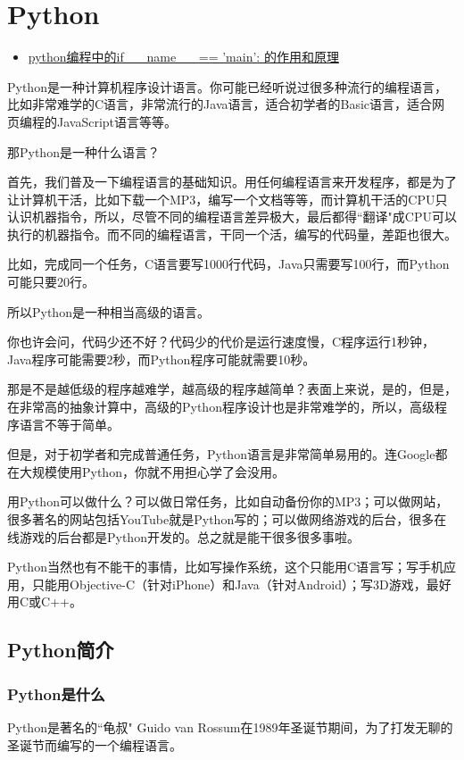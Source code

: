 \chapter{Python}

\begin{itemize}
\item \href{http://www.dengfeilong.com/post/60.html}{python编程中的if \_\_name\_\_ == 'main': 的作用和原理}
\end{itemize}

Python是一种计算机程序设计语言。你可能已经听说过很多种流行的编程语言，比如非常难学的C语言，非常流行的Java语言，适合初学者的Basic语言，适合网页编程的JavaScript语言等等。

那Python是一种什么语言？

首先，我们普及一下编程语言的基础知识。用任何编程语言来开发程序，都是为了让计算机干活，比如下载一个MP3，编写一个文档等等，而计算机干活的CPU只认识机器指令，所以，尽管不同的编程语言差异极大，最后都得``翻译"成CPU可以执行的机器指令。而不同的编程语言，干同一个活，编写的代码量，差距也很大。

比如，完成同一个任务，C语言要写1000行代码，Java只需要写100行，而Python可能只要20行。

所以Python是一种相当高级的语言。

你也许会问，代码少还不好？代码少的代价是运行速度慢，C程序运行1秒钟，Java程序可能需要2秒，而Python程序可能就需要10秒。

那是不是越低级的程序越难学，越高级的程序越简单？表面上来说，是的，但是，在非常高的抽象计算中，高级的Python程序设计也是非常难学的，所以，高级程序语言不等于简单。

但是，对于初学者和完成普通任务，Python语言是非常简单易用的。连Google都在大规模使用Python，你就不用担心学了会没用。

用Python可以做什么？可以做日常任务，比如自动备份你的MP3；可以做网站，很多著名的网站包括YouTube就是Python写的；可以做网络游戏的后台，很多在线游戏的后台都是Python开发的。总之就是能干很多很多事啦。

Python当然也有不能干的事情，比如写操作系统，这个只能用C语言写；写手机应用，只能用Objective-C（针对iPhone）和Java（针对Android）；写3D游戏，最好用C或C++。

\section{Python简介}
\subsection{Python是什么}
Python是著名的``龟叔" Guido van Rossum在1989年圣诞节期间，为了打发无聊的圣诞节而编写的一个编程语言。

